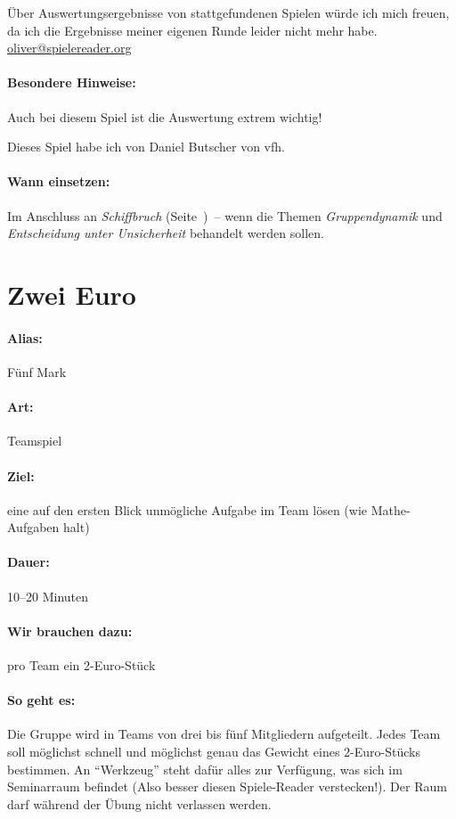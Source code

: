 Über Auswertungsergebnisse von stattgefundenen Spielen würde ich mich freuen, da ich die Ergebnisse meiner eigenen Runde leider nicht mehr habe. \url{oliver@spielereader.org}

\paragraph{Besondere Hinweise:} Auch bei diesem Spiel ist die Auswertung extrem wichtig!

Dieses Spiel habe ich von Daniel Butscher von vfh.
\paragraph{Wann einsetzen:} Im Anschluss an \emph{Schiffbruch} (Seite~\pageref{schiffbruch})~-- wenn die Themen \emph{Gruppendynamik} und \emph{Entscheidung unter Unsicherheit} behandelt werden sollen.


\section{Zwei Euro}
\paragraph{Alias:} Fünf Mark
\paragraph{Art:} Teamspiel
\paragraph{Ziel:} eine auf den ersten Blick unmögliche Aufgabe im Team lösen (wie Mathe-Aufgaben halt)
\paragraph{Dauer:} 10--20 Minuten
\paragraph{Wir brauchen dazu:} pro Team ein 2-Euro-Stück
\paragraph{So geht es:} Die Gruppe wird in Teams von drei bis fünf Mitgliedern aufgeteilt. Jedes Team soll möglichst schnell und möglichst genau das Gewicht eines 2-Euro-Stücks bestimmen. An "`Werkzeug"' steht dafür alles zur Verfügung, was sich im Seminarraum befindet (Also besser diesen Spiele-Reader verstecken!). Der Raum darf während der Übung nicht verlassen werden.

